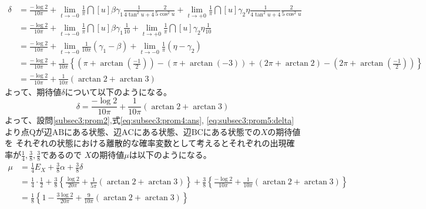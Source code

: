 \documentclass[dvipdfmx,titlepage, 11pt, a4paper]{jsarticle}%
\renewcommand{\thesection}{第\arabic{section}問}
\renewcommand{\thesubsection}{\thesection}
\begin{document}
\begin{enumerate}[(1)]
    \begin{align*}
        \delta 
        &= \frac{-\log 2}{10\pi} + \lim_{t \to -0}\frac{1}{\pi}\dint[u]{\beta}{\gamma_1}{\frac{1}{4\tan^{2}u + 4}\frac{2}{5\cos^{2}u}}
         + \lim_{t \to +0}\frac{1}{\pi}\dint[u]{\gamma_2}{\eta}{\frac{1}{4\tan^{2}u + 4}\frac{2}{5\cos^{2}u}}\\
        &= \frac{-\log 2}{10\pi} + \lim_{t \to -0}\frac{1}{\pi}\dint[u]{\beta}{\gamma_1}{\frac{1}{10}} 
         + \lim_{t \to +0}\frac{1}{\pi}\dint[u]{\gamma_2}{\eta}{\frac{1}{10}}\\
        &= \frac{-\log 2}{10\pi} + \lim_{t \to -0}\frac{1}{10\pi}(\gamma_1 - \beta) + \lim_{t \to -0}\frac{1}{\pi}(\eta - \gamma_2)\\
        &= \frac{-\log 2}{10\pi} + \frac{1}{10\pi}\left\{\left(\pi + \arctan\left(\frac{-1}{2}\right)\right) - (\pi + \arctan(-3))
        + (2\pi + \arctan 2) - \left(2\pi + \arctan\left(\frac{-1}{2}\right)\right)\right\}\\
        &= \frac{-\log 2}{10\pi} + \frac{1}{10\pi}(\arctan 2 + \arctan 3)
    \end{align*}
    よって、期待値$\delta$について以下のようになる。
    \begin{equation}
        \delta = \frac{-\log 2}{10\pi} + \frac{1}{10\pi}(\arctan 2 + \arctan 3)\label{eq:subsec3:prom5:delta}
    \end{equation}
    よって、設問\eqref{subsec3:prom2},式\eqref{eq:subsec3:prom4:ans}, \eqref{eq:subsec3:prom5:delta}
    より点$\mathrm{Q}$が辺$\mathrm{AB}$にある状態、辺$\mathrm{AC}$にある状態、辺$\mathrm{BC}$にある状態での$X$の期待値を
    それぞれの状態における離散的な確率変数として考えるとそれぞれの出現確率が$\frac{1}{4}, \frac{3}{8}, \frac{3}{8}$であるので
    $X$の期待値$\mu$は以下のようになる。
    \begin{align*}
        \mu &= \frac{1}{4}E_{X} + \frac{3}{8}\alpha + \frac{3}{8}\delta\\
        &= \frac{1}{4}\cdot\frac{1}{2} 
        + \frac{3}{8}\left\{\frac{\log 2}{20\pi} + \frac{1}{5\pi}(\arctan 2 + \arctan 3)\right\}
        + \frac{3}{8}\left\{\frac{-\log 2}{10\pi} + \frac{1}{10\pi}(\arctan 2 + \arctan 3)\right\}\\
        &= \frac{1}{8}\left\{1 - \frac{3\log 2}{20\pi} + \frac{9}{10\pi}(\arctan 2 + \arctan 3)\right\}
    \end{align*}
\end{enumerate}

\newpage

\renewcommand{\thesection}{自信のない解法or解けたとこまで}
\renewcommand{\thesubsection}{第\arabic{subsection}問}
\end{document}
